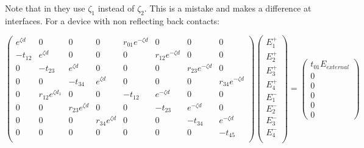 Note that in  \cite{10.1063/1.1534621} they use $\zeta_1$ instead of $\zeta_2$.  This is a mistake and makes a difference at interfaces.
For a device with non reflecting back contacts:

$
 \begin{pmatrix}
  e^{\zeta d}         & 0                   & 0                  & 0                   &r_{01}e^{-\zeta d}     & 0                       & 0                    & 0   \\
  -t_{12}              & e^{\zeta d}        & 0                  & 0                   &0                     & r_{12}e^{-\zeta d}      & 0                   & 0    \\
  0                    & -t_{23}             & e^{\zeta d}       & 0			&0                     & 0                      & r_{23}e^{-\zeta d}   & 0    \\
  0                    & 0                   & -t_{34}            & e^{\zeta d}	& 0			& 0                      & 0                   & r_{34}e^{-\zeta d} \\
  0                    &r_{12}e^{\zeta d_1} & 0                   & 0                  & -t_{12}			&e^{-\zeta d}           & 0                      & 0       \\
  0                    &0                    & r_{23}e^{\zeta d}  & 0                  & 0                     	   &-t_{23}                & e^{-\zeta d}           & 0    \\
  0                    &0                    & 0                   & r_{34}e^{\zeta d} & 0     			   &0                     & -t_{34}                & e^{-\zeta d}    \\
  0                    &0                    & 0                   & 0		  	& 0				   &0                     & 0			   & -t_{45}        \\
 \end{pmatrix}
\begin{pmatrix}
  E_{1}^{+} \\
  E_{2}^{+} \\
  E_{3}^{+}  \\
  E_{4}^{+} \\
  E_{1}^{-} \\
  E_{2}^{-} \\
  E_{3}^{-}  \\
  E_{4}^{-}  \\
 \end{pmatrix}
=
\begin{pmatrix}
  t_{01}E_{external} \\
  0 \\
  0 \\
  0 \\
  0 \\
  0 
 \end{pmatrix}
$

